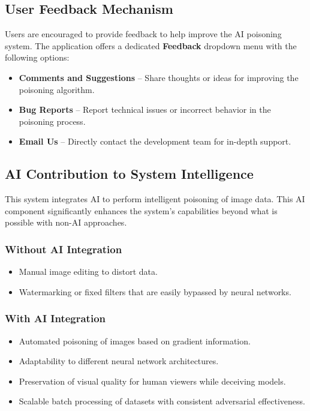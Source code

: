 \subsection{User Feedback Mechanism}
Users are encouraged to provide feedback to help improve the AI poisoning system. The application offers a dedicated \textbf{Feedback} dropdown menu with the following options:
\begin{itemize}
    \item \textbf{Comments and Suggestions} – Share thoughts or ideas for improving the poisoning algorithm.
    \item \textbf{Bug Reports} – Report technical issues or incorrect behavior in the poisoning process.
    \item \textbf{Email Us} – Directly contact the development team for in-depth support.
\end{itemize}

\subsection{AI Contribution to System Intelligence}

This system integrates AI to perform intelligent poisoning of image data. 
This AI component significantly enhances the system’s capabilities beyond what 
is possible with non-AI approaches.

\subsubsection{Without AI Integration}
\begin{itemize}
    \item Manual image editing to distort data.
    \item Watermarking or fixed filters that are easily bypassed by neural networks.
\end{itemize}

\subsubsection{With AI Integration}
\begin{itemize}
    \item Automated poisoning of images based on gradient information.
    \item Adaptability to different neural network architectures.
    \item Preservation of visual quality for human viewers while deceiving models.
    \item Scalable batch processing of datasets with consistent adversarial effectiveness.
\end{itemize}
